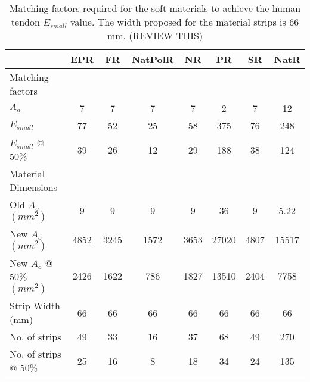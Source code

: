 \begin{table}[htbp!]
    \centering
    \caption{Matching factors required for the soft materials to achieve the human tendon $E_{small}$ value. The width proposed for the material strips is 66 mm. (REVIEW THIS)}
    \begin{tabular}{lccccccc}
    \toprule
                            & EPR & FR & NatPolR & NR & PR & SR & NatR \\
    \hline
    Matching factors \\
    \hline
    $A_o$                   & 7 & 7 & 7 & 7 & 2 & 7 & 12\\
    $E_{small}$              & 77                     & 52           & 25                     & 58      & 375          & 76       & 248           \\
    $E_{small}$ @ 50\%                          & 39                     & 26           & 12                     & 29      & 188          & 38       & 124           \\
    \hline
    Material Dimensions \\
    \midrule
    Old $A_o$ $(mm^2)$              & 9 & 9 & 9 & 9 & 36    & 9 & 5.22  \\
    New $A_o$ $(mm^2)$         & 4852                   & 3245         & 1572                   & 3653    & 27020        & 4807     & 15517         \\
    New $A_o$ @ 50\% $(mm^2)$  & 2426                   & 1622         & 786                    & 1827    & 13510        & 2404     & 7758          \\
    Strip Width (mm)       & 66  & 66    & 66    & 66    & 66    & 66    & 66    \\
    No. of strips          & 49    & 33    & 16    & 37    & 68    & 49   & 270  \\
    No. of strips @ 50\%   & 25    & 16    & 8     & 18    & 34    & 24   & 135  \\
    \bottomrule
    \end{tabular}
    \label{tbl:matching}
\end{table}

